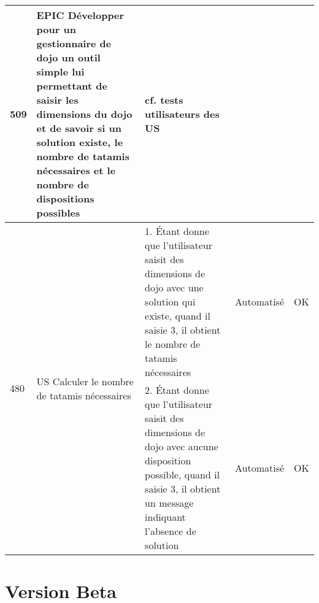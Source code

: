 \begin{adjustwidth}{-1.5cm}{0cm}
{\begin{tabular}{|m{0.6cm}|m{5.5cm}|m{8cm}|m{2cm}|c|}
            509                                                                                                      & EPIC Développer pour un gestionnaire de dojo un outil simple lui permettant de saisir les dimensions du dojo et
            de savoir si un solution existe, le nombre de tatamis nécessaires et le nombre de dispositions possibles & \cellcolor{tsgrey} cf. tests utilisateurs des US                                                                                     &                                                                                                                                                                                    &                            \\ \hline
            \multirow{2}{0.6cm}{480}                                                                                 & \multirow{2}{5.5cm}{US Calculer le nombre de tatamis nécessaires}                                                                      & 1. Étant donne que l'utilisateur saisit des dimensions de dojo avec une solution qui existe, quand il saisie 3, il obtient le nombre de tatamis nécessaires                        & Automatisé      & OK       \\ \cline{3-5}
                                                                                                                     &                                                                                                                                        & 2. Étant donne que l'utilisateur saisit des dimensions de dojo avec aucune disposition possible, quand il saisie 3, il obtient un message indiquant l'absence de solution          & Automatisé      & OK       \\ \hline
        \end{tabular}}
\end{adjustwidth}


\section{Version Beta}

